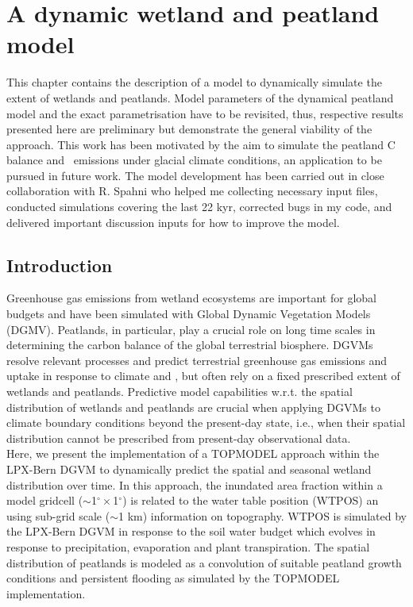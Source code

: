 \chapter{A dynamic wetland and peatland model}
\label{sec:topmodel}

This chapter contains the description of a model to dynamically simulate the extent of wetlands and peatlands. Model parameters of the dynamical peatland model and the exact parametrisation have to be revisited, thus, respective results presented here are preliminary but demonstrate the general viability of the approach. This work has been motivated by the aim to simulate the peatland C balance and \chh\ emissions under glacial climate conditions, an application to be pursued in future work. The model development has been carried out in close collaboration with R. Spahni who helped me collecting necessary input files, conducted simulations covering the last 22 kyr, corrected bugs in my code, and delivered important discussion inputs for how to improve the model.

\section{Introduction}
Greenhouse gas emissions from wetland ecosystems are important for global budgets and have been simulated with Global Dynamic Vegetation Models (DGMV). Peatlands, in particular, play a crucial role on long time scales in determining the carbon balance of the global terrestrial biosphere. DGVMs resolve relevant processes and predict terrestrial greenhouse gas emissions and uptake in response to climate and \coo , but often rely on a fixed prescribed extent of wetlands and peatlands. Predictive model capabilities w.r.t. the spatial distribution of wetlands and peatlands are crucial when applying DGVMs to climate boundary conditions beyond the present-day state, i.e., when their spatial distribution cannot be prescribed from present-day observational data.\\

Here, we present the implementation of a TOPMODEL approach within the LPX-Bern DGVM to dynamically predict the spatial and seasonal wetland distribution over time. In this approach, the inundated area fraction within a model gridcell ($\sim$1$^{\circ}\times$1$^{\circ}$) is related to the water table position (WTPOS) an using sub-grid scale ($\sim$1 km) information on topography. WTPOS is simulated by the LPX-Bern DGVM in response to the soil water budget which evolves in response to precipitation, evaporation and plant transpiration. The spatial distribution of peatlands is modeled as a convolution of suitable peatland growth conditions and persistent flooding as simulated by the TOPMODEL implementation.\\

